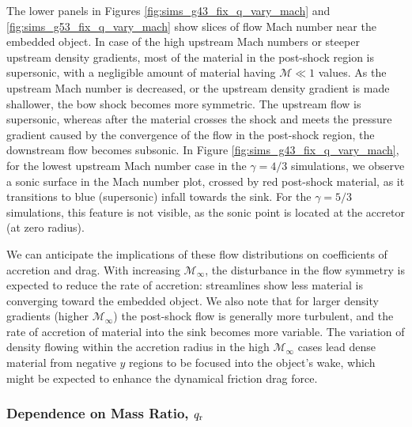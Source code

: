 The lower panels in Figures \ref{fig:sims_g43_fix_q_vary_mach} and \ref{fig:sims_g53_fix_q_vary_mach} show slices of flow Mach number near the embedded object. In case of the high upstream Mach numbers or steeper upstream density gradients, most of the material in the post-shock region is supersonic, with a negligible amount of material having $\mathcal{M} \ll 1$ values. As the upstream Mach number is decreased, or the upstream density gradient is made shallower, the bow shock becomes more symmetric. The upstream flow is supersonic, whereas after the material crosses the shock and meets the pressure gradient caused by the convergence of the flow in the post-shock region, the downstream flow becomes subsonic. %
In Figure \ref{fig:sims_g43_fix_q_vary_mach}, for the lowest upstream Mach number case in the $\gamma = 4/3$ simulations, we observe a sonic surface in the Mach number plot, crossed by red post-shock material, as it transitions to blue (supersonic) infall towards the sink. For the $\gamma=5/3$ simulations, this feature is not visible, as the sonic point is located at the accretor (at zero radius).


We can anticipate the implications of these flow distributions on coefficients of accretion and drag. With increasing $\mathcal{M}_\infty$, the disturbance in the flow symmetry is expected to reduce the rate of accretion: streamlines show less material is converging toward the embedded object.  We also note that for larger density gradients (higher $\mathcal{M}_\infty$) the post-shock flow is generally more turbulent, and the rate of accretion of material into the sink becomes more variable. The variation of density flowing within the accretion radius in the high $\mathcal{M}_\infty$ cases lead dense material from negative $y$ regions to be focused into the object's wake, which might be expected to enhance the dynamical friction drag force.

\subsubsection{Dependence on Mass Ratio, $q_{\rm r}$}\label{sec:hydro_q}

